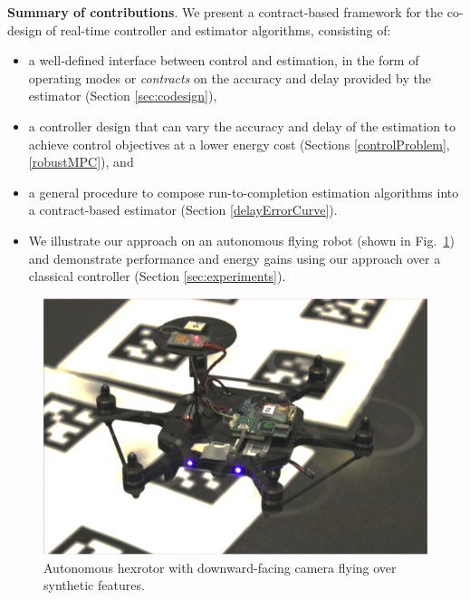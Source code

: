 \textbf{Summary of contributions}.
We present a contract-based framework for the co-design of real-time controller and estimator algorithms, consisting of:
\begin{itemize}
	\item a well-defined interface between control and estimation, in the form of operating modes or \emph{contracts} on the accuracy and delay provided by the estimator (Section \ref{sec:codesign}),
	\item a controller design that can vary the accuracy and delay of the estimation to achieve control objectives at a lower energy cost (Sections \ref{controlProblem}, \ref{robustMPC}), and
	\item a general procedure to compose run-to-completion estimation algorithms into a contract-based estimator (Section \ref{delayErrorCurve}).
	\item We illustrate our approach on an autonomous flying robot (shown in Fig.~\ref{fig:nanohex}) and demonstrate performance and energy gains using our approach over a classical controller (Section \ref{sec:experiments}).
\end{itemize}
\begin{figure}[t]
	\centering
	\includegraphics[width=0.7\linewidth]{figures/nanohex2}
	\caption{Autonomous hexrotor with downward-facing camera flying over synthetic features.}
	\label{fig:nanohex}
\end{figure}